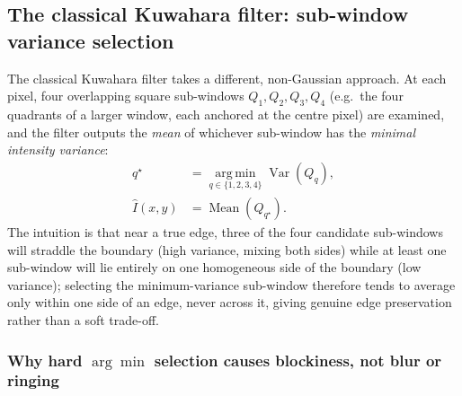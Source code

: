 \documentclass[11pt]{article}
\begin{document}
\subsection{The classical Kuwahara filter: sub-window variance selection}

The classical Kuwahara filter takes a different, non-Gaussian approach. At each pixel,
four overlapping square sub-windows $Q_1,Q_2,Q_3,Q_4$ (e.g.\ the four quadrants of a
larger window, each anchored at the centre pixel) are examined, and the filter outputs
the \emph{mean} of whichever sub-window has the \emph{minimal intensity variance}:
\begin{align}
  q^\star &= \operatorname*{arg\,min}_{q\in\{1,2,3,4\}} \operatorname{Var}(Q_q), \\
  \hat I(x,y) &= \operatorname{Mean}(Q_{q^\star}).
  \label{eq:kuwahara}
\end{align}
The intuition is that near a true edge, three of the four candidate sub-windows will
straddle the boundary (high variance, mixing both sides) while at least one sub-window
will lie entirely on one homogeneous side of the boundary (low variance); selecting
the minimum-variance sub-window therefore tends to average only within one side of an
edge, never across it, giving genuine edge preservation rather than a soft trade-off.

\subsubsection{Why hard $\arg\min$ selection causes blockiness, not blur or ringing}
\end{document}
